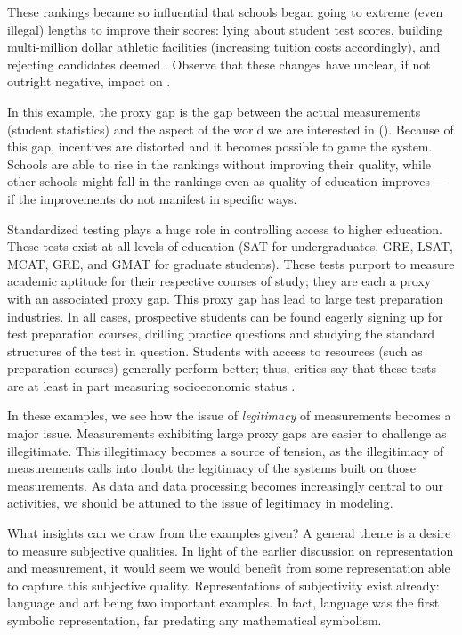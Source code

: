 These rankings became so influential that schools began going to extreme (even illegal) lengths to improve their scores: lying about student test scores, building multi-million dollar athletic facilities (increasing tuition costs accordingly), and rejecting candidates deemed  \cite{oneil}.
Observe that these changes have unclear, if not outright negative, impact on .

 In this example, the proxy gap is the gap between the actual measurements (student statistics) and the aspect of the world we are interested in ().
 Because of this gap, incentives are distorted and it becomes possible to game the system.
 Schools are able to rise in the rankings without improving their quality, while other schools might fall in the rankings even as quality of education improves --- if the improvements do not manifest in specific ways.

\bigskip

Standardized testing plays a huge role in controlling access to higher education.
These tests exist at all levels of education (SAT for undergraduates, GRE, LSAT, MCAT, GRE, and GMAT for graduate students).
These tests purport to measure academic aptitude for their respective courses of study; they are each a proxy with an associated proxy gap.
This proxy gap has lead to large test preparation industries.
In all cases, prospective students can be found eagerly signing up for test preparation courses, drilling practice questions and studying the standard structures of the test in question.
Students with access to resources (such as preparation courses) generally perform better; thus, critics say that these tests are at least in part measuring socioeconomic status \cite{zumbrin}.

\bigskip

In these examples, we see how the issue of \textit{legitimacy} of measurements becomes a major issue.
Measurements exhibiting large proxy gaps are easier to challenge as illegitimate.
This illegitimacy becomes a source of tension, as the illegitimacy of measurements calls into doubt the legitimacy of the systems built on those measurements.
As data and data processing becomes increasingly central to our activities, we should be attuned to the issue of legitimacy in modeling.

What insights can we draw from the examples given?
A general theme is a desire to measure subjective qualities.
In light of the earlier discussion on representation and measurement, it would seem we would benefit from some representation able to capture this subjective quality.
Representations of subjectivity exist already: language and art being two important examples.
In fact, language was the first symbolic representation, far predating any mathematical symbolism.

